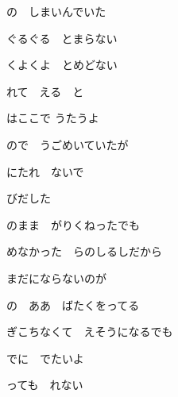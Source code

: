 \documentclass[a4paper,tate,twocolumn,12pt]{ltjtarticle}
\begin{document}
\begin{flushleft}
\begin{minipage}{\linewidth}
の　しまいんでいた

ぐるぐる　とまらない

くよくよ　とめどない

れて　える　と

はここで うたうよ
\end{minipage}

\vspace{2em}

\noindent\begin{minipage}{\linewidth}
ので　うごめいていたが

にたれ　ないで

びだした
\end{minipage}

\vspace{2em}

\noindent\begin{minipage}{\linewidth}
のまま　がりくねったでも

めなかった　らのしるしだから
\end{minipage}

\vspace{2em}

\noindent\begin{minipage}{\linewidth}
まだにならないのが

の　ああ　ばたくをってる
\end{minipage}

\vspace{2em}

\noindent\begin{minipage}{\linewidth}
ぎこちなくて　えそうになるでも

でに　でたいよ

っても　れない
\end{minipage}

\end{flushleft}
\end{document}
